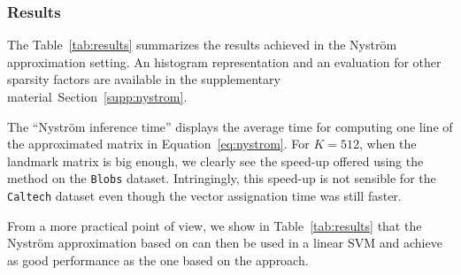 \subsubsection{Results}

The Table~\ref{tab:results} summarizes the results achieved in the Nyström approximation setting. An histogram representation and an evaluation for other sparsity factors are available in the supplementary material~Section~\ref{supp:nystrom}.

The ``Nyström inference time'' displays the average time for computing one line of the approximated matrix in Equation~\ref{eq:nystrom}. For $K=512$, when the landmark matrix is big enough, we clearly see the speed-up offered using the \qkmeans method on the \texttt{Blobs} dataset. Intringingly, this speed-up is not sensible for the \texttt{Caltech} dataset even though the vector assignation time was still faster.

% 

From a more practical point of view, we show in Table~\ref{tab:results} that the Nyström approximation based on \qkmeans can then be used in a linear SVM and achieve as good performance as the one based on the \kmeans approach.









